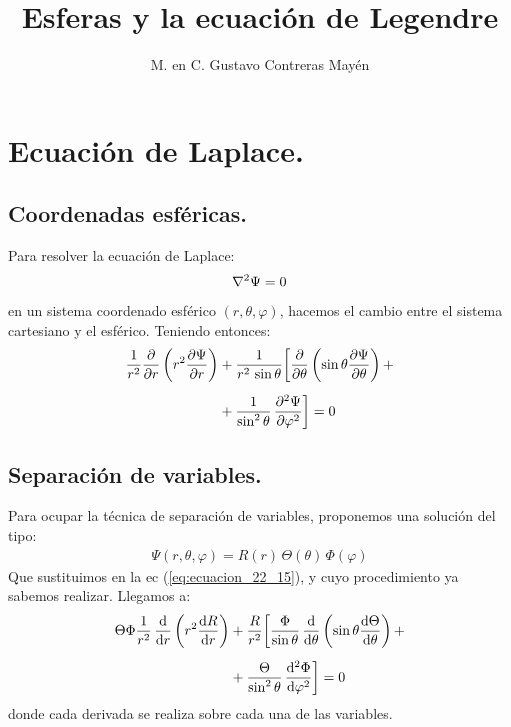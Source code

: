 \documentclass[12pt]{article}
\title{\large{Esferas y la ecuación de Legendre}}
\date{}
\author{M. en C. Gustavo Contreras Mayén}
\numberwithin{equation}{section}
\begin{document}
\maketitle
\fontsize{14}{14}\selectfont
{}
\tableofcontents
\newpage

\section{Ecuación de Laplace.}
\subsection{Coordenadas esféricas.}

Para resolver la ecuación de Laplace:
\begin{align*}
\laplacian{\Psi} = 0
\end{align*}
en un sistema coordenado esférico $(r, \theta, \varphi)$, hacemos el cambio entre el sistema cartesiano y el esférico. Teniendo entonces:
\begin{align}
\begin{aligned}[b]
\dfrac{1}{r^{2}} \pdv{r} \left( r^{2} \pdv{\Psi}{r} \right) &+ \dfrac{1}{r^{2} \, \sin \theta} \bigg[ \pdv{\theta} \left( \sin \theta \pdv{\Psi}{\theta} \right) + \\[0.5em]
&+ \dfrac{1}{\sin^{2} \theta} \, \pdv[2]{\Psi}{\varphi} \bigg] = 0
\end{aligned}
\label{eq:ecuacion_22_15}
\end{align}

\subsection{Separación de variables.}

Para ocupar la técnica de separación de variables, proponemos una solución del tipo:
\begin{align*}
\Psi (r, \theta, \varphi) = R (r) \, \Theta (\theta) \, \Phi (\varphi)
\end{align*}
Que sustituimos en la ec (\ref{eq:ecuacion_22_15}), y cuyo procedimiento ya sabemos realizar. Llegamos a:
\begin{align*}
\Theta \Phi \dfrac{1}{r^{2}} \, \dv{r} \left( r^{2} \dv{R}{r} \right) &+ \dfrac{R}{r^{2}} \bigg[ \dfrac{\Phi}{\sin \theta} \, \dv{\theta} \left( \sin \theta \dv{\Theta}{\theta} \right) + \\[0.5em]
&+ \dfrac{\Theta}{\sin^{2} \theta} \, \dv[2]{\Phi}{\varphi} \bigg] = 0
\end{align*}
donde cada derivada se realiza sobre cada una de las variables.
\end{document}

